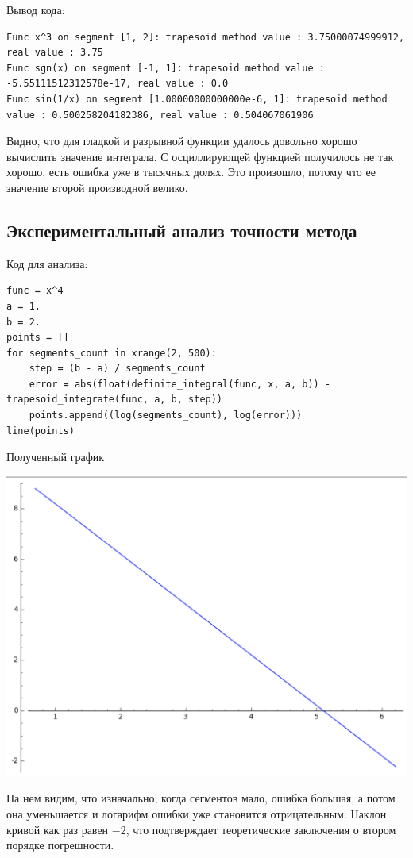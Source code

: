 \documentclass{article}
\theoremstyle{definition}
\theoremstyle{remark}
\begin{document}
Вывод кода:

\begin{lstlisting}
Func x^3 on segment [1, 2]: trapesoid method value : 3.75000074999912, real value : 3.75
Func sgn(x) on segment [-1, 1]: trapesoid method value : -5.55111512312578e-17, real value : 0.0
Func sin(1/x) on segment [1.00000000000000e-6, 1]: trapesoid method value : 0.500258204182386, real value : 0.504067061906
\end{lstlisting}

Видно, что для гладкой и разрывной функции удалось довольно хорошо вычислить значение интеграла. С осциллирующей функцией получилось не так хорошо, есть ошибка уже в тысячных долях. Это произошло, потому что ее значение второй производной велико.

\subsection{Экспериментальный анализ точности метода}


Код для анализа:

\begin{lstlisting}
func = x^4
a = 1.
b = 2.
points = []
for segments_count in xrange(2, 500):
	step = (b - a) / segments_count
	error = abs(float(definite_integral(func, x, a, b)) - trapesoid_integrate(func, a, b, step))
	points.append((log(segments_count), log(error)))
line(points)
\end{lstlisting}

Полученный график

\includegraphics[width=0.9 \textwidth]{image.png}

На нем видим, что изначально, когда сегментов мало, ошибка большая, а потом она уменьшается и логарифм ошибки уже становится отрицательным. Наклон кривой как раз равен $-2$, что подтверждает теоретические заключения о втором порядке погрешности.
\end{document}
